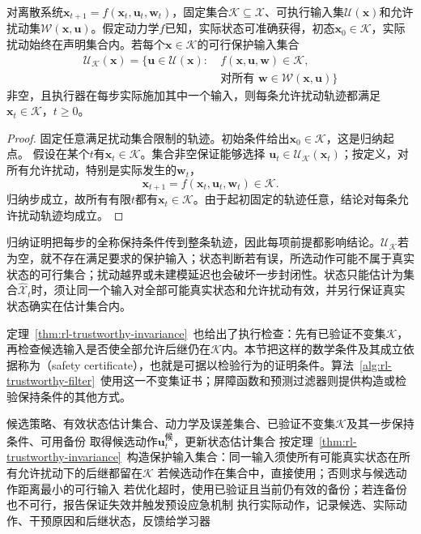 \begin{theorem}[安全集的一步封闭性保证]
  \label{thm:rl-trustworthy-invariance}
  对离散系统$\bm{x}_{t+1}=f(\bm{x}_t,\bm{u}_t,\bm{w}_t)$，固定集合$\mathcal K\subseteq\mathcal X$、可执行输入集$\mathcal U(\bm{x})$和允许扰动集$\mathcal W(\bm{x},\bm{u})$。假定动力学$f$已知，实际状态可准确获得，初态$\bm{x}_0\in\mathcal K$，实际扰动始终在声明集合内。若每个$\bm{x}\in\mathcal K$的可行保护输入集合
  \[
    \begin{aligned}
      \mathcal U_{\mathcal K}(\bm{x})
        =\bigl\{\bm{u}\in\mathcal U(\bm{x}):\ &
          f(\bm{x},\bm{u},\bm{w})\in\mathcal K,\\
        &\text{对所有 }\bm{w}\in\mathcal W(\bm{x},\bm{u})\bigr\}
    \end{aligned}
  \]
  非空，且执行器在每步实际施加其中一个输入，则每条允许扰动轨迹都满足$\bm{x}_t\in\mathcal K$，$t\geq0$。
\end{theorem}
\begin{proof}
  固定任意满足扰动集合限制的轨迹。初始条件给出$\bm{x}_0\in\mathcal K$，这是归纳起点。
  假设在某个$t$有$\bm{x}_t\in\mathcal K$。集合非空保证能够选择
  $\bm{u}_t\in\mathcal U_{\mathcal K}(\bm{x}_t)$；按定义，对所有允许扰动，特别是实际发生的$\bm{w}_t$，
  \[
    \bm{x}_{t+1}=f(\bm{x}_t,\bm{u}_t,\bm{w}_t)\in\mathcal K.
  \]
  归纳步成立，故所有有限$t$都有$\bm{x}_t\in\mathcal K$。由于起初固定的轨迹任意，结论对每条允许扰动轨迹均成立。
\end{proof}

归纳证明把每步的全称保持条件传到整条轨迹，因此每项前提都影响结论。$\mathcal U_{\mathcal K}$若为空，就不存在满足要求的保护输入；状态判断若有误，所选动作可能不属于真实状态的可行集合；扰动越界或未建模延迟也会破坏一步封闭性。状态只能估计为集合$\widehat{\mathcal X}_t$时，须让同一个输入对全部可能真实状态和允许扰动有效，并另行保证真实状态确实在估计集合内。

定理~\ref{thm:rl-trustworthy-invariance}~也给出了执行检查：先有已验证不变集$\mathcal K$，再检查候选输入是否使全部允许后继仍在$\mathcal K$内。本节把这样的数学条件及其成立依据称为（safety certificate），也就是可据以检验行为的证明条件。算法~\ref{alg:rl-trustworthy-filter}~使用这一不变集证书；屏障函数和预测过滤器则提供构造或检验保持条件的其他方式。

\begin{algorithm}[带可行性检查的安全过滤]
  \label{alg:rl-trustworthy-filter}
  \begin{algorithmic}[1]
    \Require 候选策略、有效状态估计集合、动力学及误差集合、已验证不变集$\mathcal K$及其一步保持条件、可用备份
      \State 取得候选动作$\bm{u}^{\text{候}}_t$，更新状态估计集合
      \State 按定理~\ref{thm:rl-trustworthy-invariance}~构造保护输入集合：同一输入须使所有可能真实状态在所有允许扰动下的后继都留在$\mathcal K$
      \State 若候选动作在集合中，直接使用；否则求与候选动作距离最小的可行输入
      \State 若优化超时，使用已验证且当前仍有效的备份；若连备份也不可行，报告保证失效并触发预设应急机制
      \State 执行实际动作，记录候选、实际动作、干预原因和后继状态，反馈给学习器
    \EndFor
  \end{algorithmic}
\end{algorithm}

